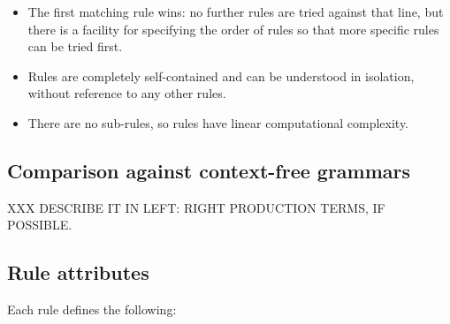 \documentclass[a4paper,12pt,draft]{article}
\begin{document}
\begin{itemize}

    \item The first matching rule wins: no further rules are tried against
        that line, but there is a facility for specifying the order of
        rules so that more specific rules can be tried first.

    \item Rules are completely self-contained and can be understood in
        isolation, without reference to any other rules.

    \item There are no sub-rules, so rules have linear computational
        complexity.

\end{itemize}


\subsection{Comparison against context-free grammars}

\label{comparison against context-free grammars}

XXX DESCRIBE IT IN LEFT\@: RIGHT PRODUCTION TERMS, IF POSSIBLE\@.

\subsection{Rule attributes}

\label{rule attributes}

Each rule defines the following:
\end{document}
